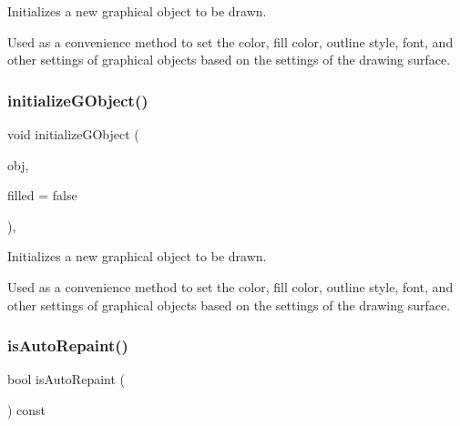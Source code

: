 Initializes a new graphical object to be drawn. 

Used as a convenience method to set the color, fill color, outline style, font, and other settings of graphical objects based on the settings of the drawing surface. \mbox{\label{classsgl_1_1GDrawingSurface_a43e6bc951980da061ddc40407daee227}} 
\subsubsection{\texorpdfstring{initialize\+G\+Object()}{initializeGObject()}\hspace{0.1cm}{\footnotesize\ttfamily [2/2]}}
{\footnotesize\ttfamily void initialize\+G\+Object (\begin{DoxyParamCaption}\item[{\mbox{\hyperlink{classsgl_1_1GObject}{G\+Object}} $\ast$}]{obj,  }\item[{bool}]{filled = {\ttfamily false} }\end{DoxyParamCaption})\hspace{0.3cm}{\ttfamily [protected]}, {\ttfamily [virtual]}}



Initializes a new graphical object to be drawn. 

Used as a convenience method to set the color, fill color, outline style, font, and other settings of graphical objects based on the settings of the drawing surface. \mbox{\label{classsgl_1_1GDrawingSurface_a12c8d52ddfcaa5448ec4bace92ddee6c}} 
\subsubsection{\texorpdfstring{is\+Auto\+Repaint()}{isAutoRepaint()}}
{\footnotesize\ttfamily bool is\+Auto\+Repaint (\begin{DoxyParamCaption}{ }\end{DoxyParamCaption}) const\hspace{0.3cm}{\ttfamily [virtual]}}



